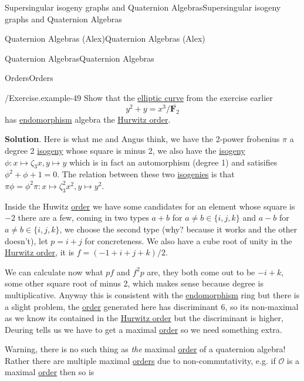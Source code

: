 \documentclass[10pt,]{book}
\numberwithin{equation}{section}
\newcommand{\FF}{\mathbf{F}}
\newcommand{\ints}{\mathcal{O}}
\begin{document}
\begin{chapterptx}{Supersingular isogeny graphs and Quaternion Algebras}{}{Supersingular isogeny graphs and Quaternion Algebras}{}{}
\begin{sectionptx}{Quaternion Algebras (Alex)}{}{Quaternion Algebras (Alex)}{}{}
\begin{subsectionptx}{Quaternion Algebras}{}{Quaternion Algebras}{}{}
\begin{subsubsectionptx}{Orders}{}{Orders}{}{}
\begin{example}{/Exercise.}{example-49}
\hypertarget{p-911}{}%
Show that the \hyperref[def-supersing-isog-ec]{elliptic curve} from the exercise earlier%
\begin{equation*}
y^2 + y = x^3/\overline{\FF_2}
\end{equation*}
has \hyperref[def-supersing-isog-endo]{endomorphism} algebra the \hyperref[ex-hurwitz-order]{Hurwitz order}.%
\par\smallskip%
\noindent\textbf{Solution}.\hypertarget{solution-1}{}\quad%
\hypertarget{p-912}{}%
Here is what me and Angus think, we have the 2-power frobenius \(\pi\) a degree 2 \hyperref[def-supersing-isog-isog]{isogeny} whose square is minus 2, we also have the \hyperref[def-supersing-isog-isog]{isogeny} \(\phi \colon x\mapsto \zeta_3 x, y\mapsto y\) which is in fact an automorphism (degree 1) and satisifies \(\phi^2 + \phi + 1 = 0\). The relation between these two \hyperref[def-supersing-isog-isog]{isogenies} is that \(\pi \phi  = \phi^2 \pi \colon x\mapsto \zeta_3^2 x^2, y\mapsto y^2\).%
\par
\hypertarget{p-913}{}%
Inside the Huwitz \hyperref[def-order-quaternion]{order} we have some candidates for an element whose square is \(-2\) there are a few, coming in two types \(a+ b\) for \(a \ne b \in \{i,j,k\}\) and \(a-b\) for \(a\ne b\in \{i,j,k\}\), we choose the second type (why? because it works and the other doesn't), let \(p = i + j\) for concreteness. We also have a cube root of unity in the \hyperref[ex-hurwitz-order]{Hurwitz order}, it is \(f = (-1 + i + j + k)/2\).%
\par
\hypertarget{p-914}{}%
We can calculate now what \(pf\) and \(f^2 p\) are, they both come out to be \(- i + k\), some other square root of minus 2, which makes sense because degree is multiplicative. Anyway this is consistent with the \hyperref[def-supersing-isog-endo]{endomorphism} ring but there is a slight problem, the \hyperref[def-order-quaternion]{order} generated here has discriminant \(6\), so its non-maximal as we know its contained in the \hyperref[ex-hurwitz-order]{Hurwitz order} but the discriminant is higher, Deuring tells us we have to get a maximal \hyperref[def-order-quaternion]{order} so we need something extra.%
\end{example}
\hypertarget{p-915}{}%
Warning, there is no such thing as \emph{the} maximal \hyperref[def-order-quaternion]{order} of a quaternion algebra! Rather there are multiple maximal \hyperref[def-order-quaternion]{orders} due to non-commutativity, e.g. if \(\ints\) is a maximal \hyperref[def-order-quaternion]{order} then so is%

\end{subsubsectionptx}
\end{subsectionptx}
\end{sectionptx}
\end{chapterptx}
\end{document}
